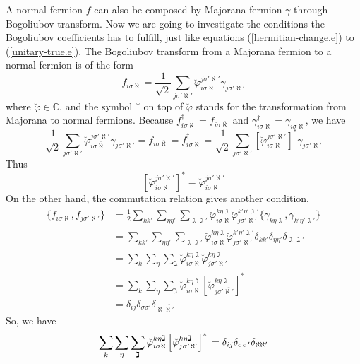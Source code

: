 \documentclass[12font]{article}
\theoremstyle{definition}
\numberwithin{equation}{section}
\newcommand{\llrg}[1]{\{  #1  \}}
\newcommand{\lrm}[1]{\left[  #1  \right]}
\begin{document}
A normal fermion $f$ can also be composed by Majorana fermion $\gamma$ through Bogoliubov transform. Now we are going to investigate the conditions the Bogoliubov coefficients has to fulfill, just like equations (\ref{hermitian-change.e}) to (\ref{unitary-true.e}). The Bogoliubov transform from a Majorana fermion to a normal fermion is of the form
\[
f_{i\sigma\aleph} = \frac{1}{\sqrt{2}}\sum_{j\sigma'\aleph'} \breve{\varphi}_{i\sigma\aleph}^{j\sigma'\aleph'}\gamma_{j\sigma'\aleph'}
\]
where $\breve{\varphi}\in\mathbb{C}$, and the symbol ˘ on top of $\breve{\varphi}$ stands for the transformation from Majorana to normal fermions. Because $f_{i\sigma\aleph}^\dagger = f_{i\sigma\overline{\aleph}}$ and $\gamma_{i\sigma\aleph}^\dagger = \gamma_{i\sigma\aleph}$, we have
\[
\frac{1}{\sqrt{2}}\sum_{j\sigma'\aleph'} \breve{\varphi}_{i\sigma\overline{\aleph}}^{j\sigma'\aleph'}\gamma_{j\sigma'\aleph'} = f_{i\sigma\overline{\aleph}} 
= f_{i\sigma\aleph}^\dagger
= \frac{1}{\sqrt{2}}\sum_{j\sigma'\aleph'} \lrm{\breve{\varphi}_{i\sigma\aleph}^{j\sigma'\aleph'}}^*\gamma_{j\sigma'\aleph'}
\]
Thus
\begin{equation}\label{hermitian-change-Maj.e}
\lrm{\breve{\varphi}_{i\sigma\aleph}^{j\sigma'\aleph'}}^* = \breve{\varphi}_{i\sigma\overline{\aleph}}^{j\sigma'\aleph'}
\end{equation}
On the other hand, the commutation relation gives another condition,
\begin{align*}
    \llrg{f_{i\sigma\aleph},f_{j\sigma'\aleph'}} 
    &= \frac{1}{2}\sum_{kk'}\sum_{\eta\eta'}\sum_{\gimel\gimel'} \breve{\varphi}^{k\eta\gimel}_{i\sigma\aleph} \breve{\varphi}^{k'\eta'\gimel'}_{j\sigma'\aleph'} \llrg{ \gamma_{k\eta\gimel}, \gamma_{k'\eta'\gimel'} }\\ 
    &= \sum_{kk'}\sum_{\eta\eta'}\sum_{\gimel\gimel'} \breve{\varphi}^{k\eta\gimel}_{i\sigma\aleph} \breve{\varphi}^{k'\eta'\gimel'}_{j\sigma'\aleph'} \delta_{kk'} \delta_{\eta\eta'}\delta_{\gimel\gimel'} \\
    &= \sum_{k}\sum_{\eta}\sum_{\gimel} \breve{\varphi}^{k\eta\gimel}_{i\sigma\aleph} \breve{\varphi}^{k\eta\gimel}_{j\sigma'\aleph'} \\
    &= \sum_{k}\sum_{\eta}\sum_{\gimel} \breve{\varphi}^{k\eta\gimel}_{i\sigma\aleph} \lrm{\breve{\varphi}^{k\eta\gimel}_{j\sigma'\overline{\aleph'}}}^*\\
    &=\delta_{ij}\delta_{\sigma\sigma'}\delta_{\aleph\overline{\aleph'}}
\end{align*}
So, we have
\begin{equation}\label{unitary-Maj.e}
  \sum_{k}\sum_{\eta}\sum_{\gimel} \breve{\varphi}^{k\eta\gimel}_{i\sigma\aleph} \lrm{\breve{\varphi}^{k\eta\gimel}_{j\sigma'\aleph'}}^*\\
    =\delta_{ij}\delta_{\sigma\sigma'}\delta_{\aleph\aleph'}
\end{equation}
\end{document}
